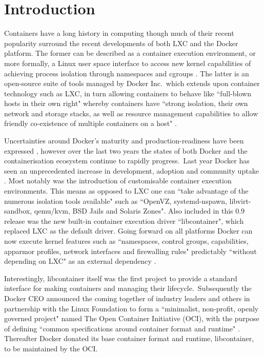 \documentclass{article}
\begin{document}
\section{Introduction}
Containers have a long history in computing though much of their recent popularity
surround the recent developments of both LXC and the Docker platform.
The former can be described as a container execution environment,
or more formally, a Linux user space interface to
access new kernel capabilities of achieving process isolation through namespaces
and cgroups \citep{Claus}. The latter is an open-source suite of tools managed by Docker Inc.\ which
extends upon container technology such as LXC, in turn
allowing containers to behave like ``full-blown hosts in their own right"
whereby containers have ``strong isolation, their own network and storage stacks, as well
as resource management capabilities to allow friendly co-existence of multiple containers on a host" \citep{db}.
\par
Uncertainties around Docker's maturity and production-readiness have been expressed \citep{Kereki, Powers, Merkel}, however
over the last two years the states of both Docker and the containerisation ecosystem continue to rapidly progress.\
Last year Docker has seen an unprecedented increase in development, adoption and community uptake \citep{Merkel}. Most
notably was the introduction of customisable container execution environments. This means as opposed to LXC one can
``take advantage of the numerous isolation tools available" such as ``OpenVZ, systemd-nspawn, libvirt-sandbox, qemu/kvm, BSD Jails and Solaris Zones".
Also included in this 0.9 release was the new built-in container execution driver ``libcontainer", which replaced LXC as the default driver.
Going forward on all platforms Docker can now execute kernel features such as ``namespaces, control groups, capabilities, apparmor profiles,
network interfaces and firewalling rules" predictably ``without depending on LXC" as an external dependency \citep{Hykes}.
\par
Interestingly, libcontainer itself was the first project to provide a standard interface for making containers and managing their lifecycle.\
Subsequently the Docker CEO  announced the coming together of industry leaders and others in partnership with the Linux Foundation
to form a ``minimalist, non-profit, openly governed project" named The Open Container Initiative (OCI), with the purpose of defining
``common specifications around container format and runtime" \citep{Golub}.
Thereafter Docker donated its base container format and runtime, libcontainer, to be maintained by the OCI.
\end{document}
